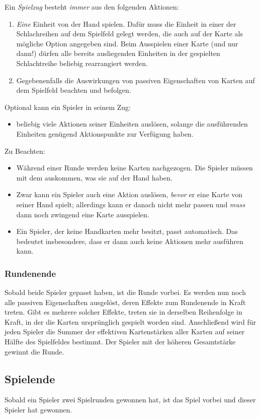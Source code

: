 \documentclass[a4paper,11pt]{report}
\begin{document}
Ein \emph{Spielzug} besteht \emph{immer} aus den folgenden Aktionen:
\begin{enumerate}
	\item \emph{Eine} Einheit von der Hand spielen. Dafür muss die Einheit in einer der Schlachreihen auf dem Spielfeld gelegt werden, die auch auf der Karte als mögliche Option angegeben sind. Beim Ausspielen einer Karte (und nur dann!) dürfen alle bereits ausliegenden Einheiten in der gespielten Schlachtreihe beliebig rearrangiert werden.
	\item Gegebenenfalls die Auswirkungen von passiven Eigenschaften von Karten auf dem Spielfeld beachten und befolgen. 
\end{enumerate}
Optional kann ein Spieler in seinem Zug:
\begin{itemize}
	\item beliebig viele Aktionen seiner Einheiten auslösen, solange die ausführenden Einheiten genügend Aktionspunkte zur Verfügung haben.
\end{itemize}

Zu Beachten: 
\begin{itemize}
	\item Während einer Runde werden keine Karten nachgezogen. Die Spieler müssen mit dem auskommen, was sie auf der Hand haben.
	\item Zwar kann ein Spieler auch eine Aktion auslösen, \emph{bevor} er eine Karte von seiner Hand spielt; allerdings kann er danach nicht mehr passen und \emph{muss} dann noch zwingend eine Karte ausspielen. 
	\item Ein Spieler, der keine Handkarten mehr besitzt, passt automatisch. Das bedeutet insbesondere, dass er dann auch keine Aktionen mehr ausführen kann.
\end{itemize}

\subsubsection{Rundenende}
Sobald beide Spieler gepasst haben, ist die Runde vorbei. Es werden nun noch alle passiven Eigenschaften ausgelöst, deren Effekte zum Rundenende in Kraft treten. Gibt es mehrere solcher Effekte,  treten sie in derselben Reihenfolge in Kraft, in der die Karten ursprünglich gespielt worden sind.
Anschließend wird für jeden Spieler die Summer der effektiven Kartenstärken aller Karten auf seiner Hälfte des Spielfeldes bestimmt. Der Spieler mit der höheren Gesamtstärke gewinnt die Runde.

\subsection{Spielende}
Sobald ein Spieler zwei Spielrunden gewonnen hat, ist das Spiel vorbei und dieser Spieler hat gewonnen.
\end{document}
